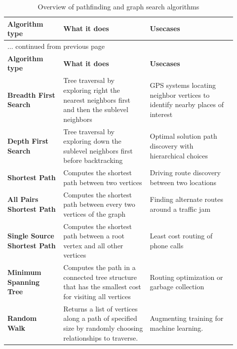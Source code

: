\begin{center}
	\vspace*{-0.25cm}
	\begin{longtable}{p{0.22\linewidth}p{0.3475\linewidth}p{0.3475\linewidth}}
		\hline \hline
		\textbf{Algorithm type} & \textbf{What it does} & \textbf{Usecases}\\
		\hline \hline
		\endfirsthead
		
		\multicolumn{3}{l}{... continued from previous page}\\
		\hline \hline
		\textbf{Algorithm type} & \textbf{What it does} & \textbf{Usecases}\\
		\hline \hline
		\endhead
		
		\hline
		\caption*{\tablename\ \thetable{}: \nameref*{longtable:pathfindingandgraphsearchalgorithms}\sfcite{NeedhamHodler2021}. Continues on next page ...}
		\vspace*{0.5cm}
		\endfoot
		
		\hline
		\caption[Overview of pathfinding and graph search algorithms]{Overview of pathfinding and graph search algorithms\sfcite{NeedhamHodler2021}}\label{longtable:pathfindingandgraphsearchalgorithms}
		\vspace*{0.5cm}
		\endlastfoot

		\textbf{Breadth First Search}\sfcite{WikipediaBreadthfirstsearch2021} & Tree traversal by exploring right the nearest neighbors first and then the sublevel neighbors & GPS systems locating neighbor vertices to identify nearby places of interest\\
		\hline
		\textbf{Depth First Search}\sfcite{WikipediaDepthfirstsearch2021} & Tree traversal by exploring down the sublevel neighbors first before backtracking & Optimal solution path discovery with hierarchical choices\\
		\hline
		\textbf{Shortest Path} & Computes the shortest path between two vertices & Driving route discovery between two locations\\
		\hline
		\textbf{All Pairs Shortest Path} & Computes the shortest path between every two vertices of the graph & Finding alternate routes around a traffic jam\\
		\hline
		\textbf{Single Source Shor\-t\-est Path} & Computes the shortest path between a root vertex and all other vertices & Least cost routing of phone calls\\
		\hline
		\textbf{Minimum Spanning Tree} & Computes the path in a connected tree structure that has the smallest cost for visiting all vertices & Routing optimization or garbage collection\\
		\hline
		\textbf{\gls{Random Walk}} & Returns a list of vertices along a path of specified size by randomly choosing relationships to traverse. & Augmenting training for machine learning.\\
		\hline
	\end{longtable}
	\vspace*{-1.35cm}
\end{center}
\par


